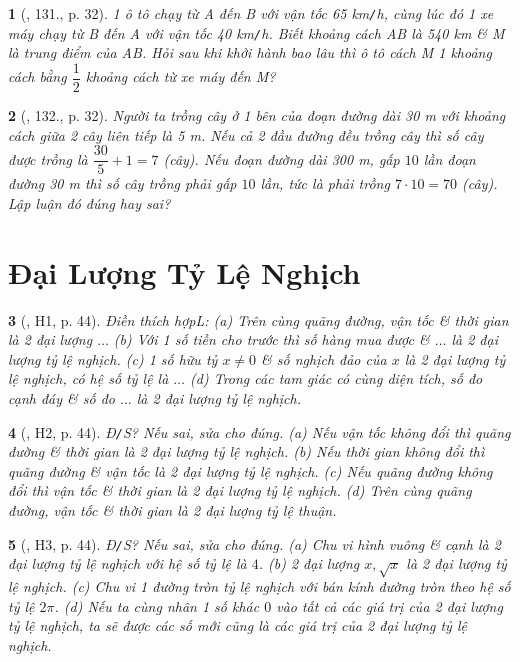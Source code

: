 \documentclass{article}
\newtheorem{baitoan}{}
\begin{document}
\begin{baitoan}[\cite{Tuyen_Toan_7}, 131., p. 32]
	1 ô tô chạy từ A đến B với vận tốc {\rm65 km{\tt/}h}, cùng lúc đó 1 xe máy chạy từ B đến A với vận tốc {\rm40 km{\tt/}h}. Biết khoảng cách AB là {\rm540 km} \& M là trung điểm của AB. Hỏi sau khi khởi hành bao lâu thì ô tô cách M 1 khoảng cách bằng $\dfrac{1}{2}$ khoảng cách từ xe máy đến M?
\end{baitoan}

\begin{baitoan}[\cite{Tuyen_Toan_7}, 132., p. 32]
	Người ta trồng cây ở 1 bên của đoạn đường dài {\rm30 m} với khoảng cách giữa 2 cây liên tiếp là {\rm5 m}. Nếu cả 2 đầu đường đều trồng cây thì số cây được trồng là $\dfrac{30}{5} + 1 = 7$ (cây). Nếu đoạn đường dài {\rm300 m}, gấp $10$ lần đoạn đường {\rm30 m} thì số cây trồng phải gấp $10$ lần, tức là phải trồng $7\cdot 10 = 70$ (cây). Lập luận đó đúng hay sai?
\end{baitoan}


\section{Đại Lượng Tỷ Lệ Nghịch}

\begin{baitoan}[\cite{Binh_boi_duong_Toan_7_tap_1}, H1, p. 44]
	Điền thích hợpL: (a) Trên cùng quãng đường, vận tốc \& thời gian là 2 đại lượng $\ldots$ (b) Với 1 số tiền cho trước thì số hàng mua được \& $\ldots$ là 2 đại lượng tỷ lệ nghịch. (c) 1 số hữu tỷ $x\ne0$ \& số nghịch đảo của $x$ là 2 đại lượng tỷ lệ nghịch, có hệ số tỷ lệ là $\ldots$ (d) Trong các tam giác có cùng diện tích, số đo cạnh đáy \& số đo $\ldots$ là 2 đại lượng tỷ lệ nghịch.
\end{baitoan}

\begin{baitoan}[\cite{Binh_boi_duong_Toan_7_tap_1}, H2, p. 44]
	{\rm Đ{\tt/}S?} Nếu sai, sửa cho đúng. (a) Nếu vận tốc không đổi thì quãng đường \& thời gian là 2 đại lượng tỷ lệ nghịch. (b) Nếu thời gian không đổi thì quãng đường \& vận tốc là 2 đại lượng tỷ lệ nghịch. (c) Nếu quãng đường không đổi thì vận tốc \& thời gian là 2 đại lượng tỷ lệ nghịch. (d) Trên cùng quãng đường, vận tốc \& thời gian là 2 đại lượng tỷ lệ thuận.
\end{baitoan}

\begin{baitoan}[\cite{Binh_boi_duong_Toan_7_tap_1}, H3, p. 44]
	{\rm Đ{\tt/}S?} Nếu sai, sửa cho đúng. (a) Chu vi hình vuông \& cạnh là 2 đại lượng tỷ lệ nghịch với hệ số tỷ lệ là $4$. (b) 2 đại lượng $x,\sqrt{x}$ là 2 đại lượng tỷ lệ nghịch. (c) Chu vi 1 đường tròn tỷ lệ nghịch với bán kính đường tròn theo hệ số tỷ lệ $2\pi$. (d) Nếu ta cùng nhân 1 số khác $0$ vào tất cả các giá trị của 2 đại lượng tỷ lệ nghịch, ta sẽ được các số mới cũng là các giá trị của 2 đại lượng tỷ lệ nghịch.
\end{baitoan}
\end{document}
